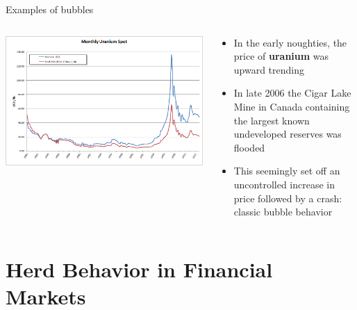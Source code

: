 \documentclass[english,10pt
,aspectratio=169
]{beamer}
\begin{document}
\begin{frame}[handout:0]{Examples of bubbles}
	\begin{columns}
		\begin{column}{0.55\linewidth}
			\center
			\includegraphics[width=\linewidth]{pics/Uranium}
		\end{column}
		\begin{column}{0.45\linewidth}
			\begin{itemize}
				\item In the early noughties, the price of \textbf{uranium} was upward trending
				\item In late 2006 the Cigar Lake Mine in Canada containing the largest known undeveloped reserves was flooded
				\item This seemingly set off an uncontrolled increase in price followed by a crash: classic bubble behavior
			\end{itemize}
		\end{column}
	\end{columns}
\end{frame}






\section{Herd Behavior in Financial Markets}
\end{document}
